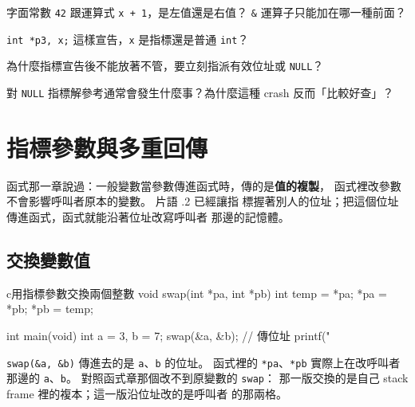 

\begin{drills}[label=drills:ptr-basics]
\item 字面常數 \texttt{42} 跟運算式 \texttt{x + 1}，是左值還是右值？
\texttt{\&} 運算子只能加在哪一種前面？
\item \texttt{int *p3, x;} 這樣宣告，\texttt{x} 是指標還是普通
\texttt{int}？
\item 為什麼指標宣告後不能放著不管，要立刻指派有效位址或
\texttt{NULL}？
\item 對 \texttt{NULL} 指標解參考通常會發生什麼事？為什麼這種
crash 反而「比較好查」？
\end{drills}

\section{指標參數與多重回傳}
\label{sec:ptr-params}

函式那一章說過：一般變數當參數傳進函式時，傳的是\textbf{值的複製}，
函式裡改參數不會影響呼叫者原本的變數。 片語 \thechapter.2 已經讓指
標握著別人的位址；把這個位址傳進函式，函式就能沿著位址改寫呼叫者
那邊的記憶體。

\subsection{交換變數值}

\begin{code}{c}{用指標參數交換兩個整數}
void swap(int *pa, int *pb) {
    int temp = *pa;
    *pa = *pb;
    *pb = temp;
}

int main(void) {
    int a = 3, b = 7;
    swap(&a, &b);          // 傳位址
    printf("%
}
\end{code}

\texttt{swap(\&a, \&b)} 傳進去的是 \texttt{a}、\texttt{b} 的位址。
函式裡的 \texttt{*pa}、\texttt{*pb} 實際上在改呼叫者那邊的
\texttt{a}、\texttt{b}。 對照函式章那個改不到原變數的 \texttt{swap}：
那一版交換的是自己 stack frame 裡的複本；這一版沿位址改的是呼叫者
的那兩格。

